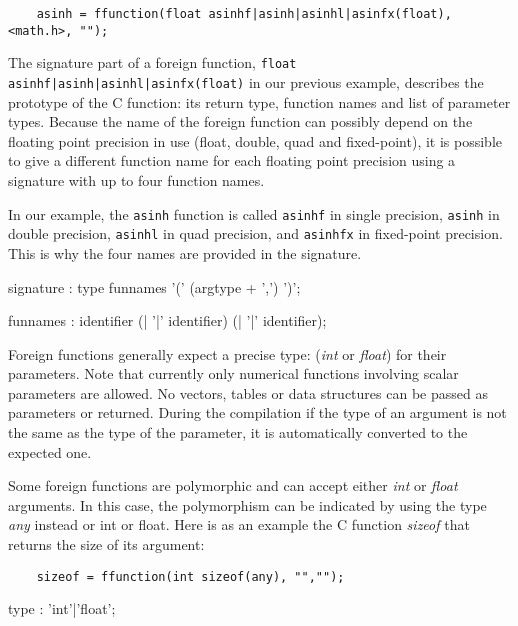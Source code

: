 \begin{lstlisting}
	asinh = ffunction(float asinhf|asinh|asinhl|asinfx(float), <math.h>, "");
\end{lstlisting}


The signature part of a foreign function, \lstinline'float asinhf|asinh|asinhl|asinfx(float)' in our previous example, describes the prototype of the C function: its return type, function names and list of parameter types. Because the name of the foreign function can possibly depend on the floating point precision in use (float, double, quad and fixed-point), it is possible to give a different function name for each floating point precision using a signature with up to four function names. 

In our example, the \lstinline'asinh' function is called \lstinline'asinhf' in single precision, \lstinline'asinh' in double precision, \lstinline'asinhl' in quad precision, and \lstinline'asinhfx' in fixed-point precision. This is why the four names are provided in the signature.


\begin{rail}
signature : type funnames '(' (argtype + ',') ')';
\end{rail}

\begin{rail}
funnames : identifier (| '|' identifier) (| '|' identifier);
\end{rail}

Foreign functions generally expect a precise type: (\textit{int} or \textit{float}) for their parameters. Note that currently only numerical functions involving scalar parameters are allowed. No vectors, tables or data structures can be passed as parameters or returned. During the compilation if the type of an argument is not the same as the type of the parameter, it is automatically converted to the expected one.

Some foreign functions are polymorphic and can accept either \textit{int} or \textit{float} arguments. In this case, the polymorphism can be indicated by using the type \textit{any} instead or int or float. Here is as an example the C function \textit{sizeof} that returns the size of its argument:

\begin{lstlisting}
	sizeof = ffunction(int sizeof(any), "","");
\end{lstlisting}

\begin{rail}
	type : 'int'|'float';
\end{rail}

